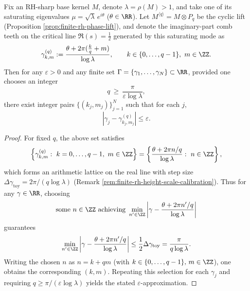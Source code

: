 \begin{proposition}\label{prop:finite-rh-zero-engineering-eps}
Fix an RH-sharp base kernel \(M\), denote \(\lambda=\rho(M)>1\), and take one of its saturating eigenvalues \(\mu=\sqrt{\lambda}\,e^{i\theta}\) (\(\theta\in\RR\)).
Let \(M^{\langle q\rangle}=M\otimes P_q\) be the cyclic lift (Proposition \ref{prop:finite-rh-phase-lift}), and denote the imaginary-part comb teeth on the critical line \(\Re(s)=\tfrac12\) generated by this saturating mode as
\[
\gamma_{k,m}^{(q)}:=\frac{\theta+2\pi(\frac{k}{q}+m)}{\log\lambda},
\qquad k\in\{0,\dots,q-1\},\ m\in\ZZ.
\]
Then for any \(\varepsilon>0\) and any finite set \(\Gamma=\{\gamma_1,\dots,\gamma_N\}\subset\RR\), provided one chooses an integer
\[
q\ \ge\ \frac{\pi}{\varepsilon\log\lambda},
\]
there exist integer pairs \(\{(k_j,m_j)\}_{j=1}^N\) such that for each \(j\),
\[
\left|\gamma_j-\gamma_{k_j,m_j}^{(q)}\right|\le \varepsilon.
\]
\end{proposition}
\begin{proof}
For fixed \(q\), the above set satisfies
\[
\left\{\gamma_{k,m}^{(q)}:\ k=0,\dots,q-1,\ m\in\ZZ\right\}
=\left\{\frac{\theta+2\pi n/q}{\log\lambda}:\ n\in\ZZ\right\},
\]
which forms an arithmetic lattice on the real line with step size \(\Delta\gamma_{\mathrm{toy}}=2\pi/(q\log\lambda)\) (Remark \ref{rem:finite-rh-height-scale-calibration}).
Thus for any \(\gamma\in\RR\), choosing
\[
\text{some }n\in\ZZ\text{ achieving }\min_{n'\in\ZZ}\left|\gamma-\frac{\theta+2\pi n'/q}{\log\lambda}\right|
\]
guarantees
\[
\min_{n'\in\ZZ}\left|\gamma-\frac{\theta+2\pi n'/q}{\log\lambda}\right|
\le \frac{1}{2}\Delta\gamma_{\mathrm{toy}}
=\frac{\pi}{q\log\lambda}.
\]
Writing the chosen \(n\) as \(n=k+qm\) (with \(k\in\{0,\dots,q-1\},\,m\in\ZZ\)), one obtains the corresponding \((k,m)\).
Repeating this selection for each \(\gamma_j\) and requiring \(q\ge \pi/(\varepsilon\log\lambda)\) yields the stated \(\varepsilon\)-approximation.
\end{proof}

